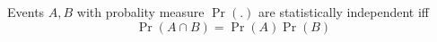 Events $A, B$ with probality measure $\operatorname{Pr}(.)$ are statistically independent iff 
$$\operatorname{Pr}(A \cap B) = \operatorname{Pr}(A) \operatorname{Pr}(B)$$
